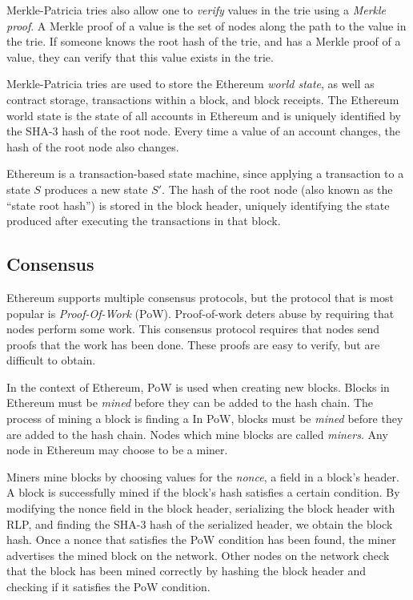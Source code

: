 \documentclass[12pt]{article}
\newcounter{protocol}
\begin{document}
Merkle-Patricia tries also allow one to \emph{verify} values in the trie using a \emph{Merkle proof}. A Merkle proof of a value is the set of nodes along the path to the value in the trie. If someone knows the root hash of the trie, and has a Merkle proof of a value, they can verify that this value exists in the trie.


Merkle-Patricia tries are used to store the Ethereum \emph{world state}, as well as contract storage, transactions within a block, and block receipts. The Ethereum world state is the state of all accounts in Ethereum and is uniquely identified by the SHA-3 hash of the root node. Every time a value of an account changes, the hash of the root node also changes.

Ethereum is a transaction-based state machine, since applying a transaction to a state $S$ produces a new state $S'$. The hash of the root node (also known as the ``state root hash'') is stored in the block header, uniquely identifying the state produced after executing the transactions in that block.


\subsection{Consensus}
Ethereum supports multiple consensus protocols, but the protocol that is most popular is \emph{Proof-Of-Work} (PoW). Proof-of-work deters abuse by requiring that nodes perform some work. This consensus protocol requires that nodes send proofs that the work has been done. These proofs are easy to verify, but are difficult to obtain.

In the context of Ethereum, PoW is used when creating new blocks. Blocks in Ethereum must be \emph{mined} before they can be added to the hash chain. The process of mining a block is finding a
In PoW, blocks must be \emph{mined} before they are added to the hash chain. Nodes which mine blocks are called \emph{miners}. Any node in Ethereum may choose to be a miner.

Miners mine blocks by choosing values for the \emph{nonce}, a field in a block's header. A block is successfully mined if the block's hash satisfies a certain condition. By modifying the nonce field in the block header, serializing the block header with RLP, and finding the SHA-3 hash of the serialized header, we obtain the block hash. Once a nonce that satisfies the PoW condition has been found, the miner advertises the mined block on the network. Other nodes on the network check that the block has been mined correctly by hashing the block header and checking if it satisfies the PoW condition.
\end{document}
